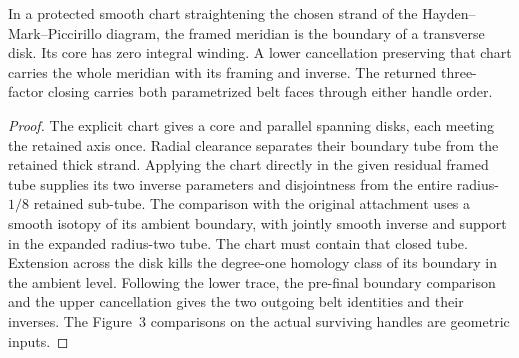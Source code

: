 \begin{proposition}
\label{prop:ed53-hmp}
\leanok
In a protected smooth chart straightening the chosen strand of the
Hayden--Mark--Piccirillo diagram, the framed meridian is the boundary
of a transverse disk. Its core has zero integral winding. A lower
cancellation preserving that chart carries the whole meridian with its
framing and inverse. The returned three-factor closing carries both
parametrized belt faces through either handle order.
\end{proposition}
\begin{proof}
\leanok
The explicit chart gives a core and parallel spanning disks, each meeting
the retained axis once. Radial clearance separates their boundary tube
from the retained thick strand. Applying the chart directly in the given
residual framed tube supplies its two inverse parameters and disjointness
from the entire radius-$1/8$ retained sub-tube. The comparison with
the original attachment uses a smooth isotopy of its ambient boundary,
with jointly smooth inverse and support in the expanded radius-two tube.
The chart must contain that closed tube. Extension across the disk kills the
degree-one homology class of its boundary in the ambient level.
Following the lower trace, the pre-final boundary comparison and the
upper cancellation gives the two outgoing belt identities and their inverses.
The Figure~3 comparisons on the actual surviving handles are geometric inputs.
\end{proof}

